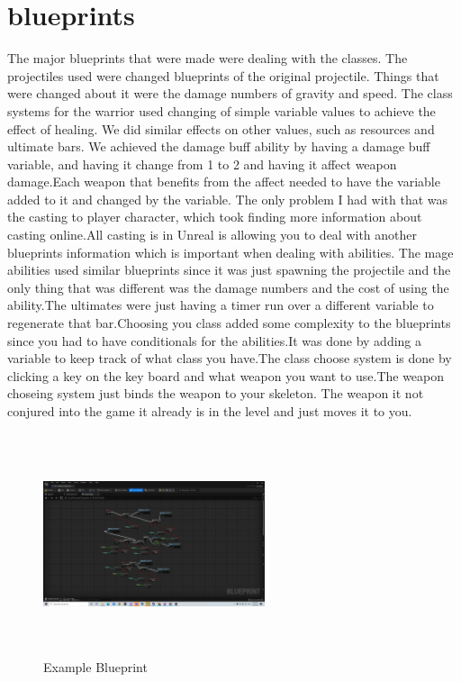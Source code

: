 \documentclass{sigchi}
\begin{document}
\section{blueprints}
The major blueprints that were made were dealing with the classes. The projectiles used were changed blueprints of the original projectile. Things that were changed about it were the damage numbers of gravity and speed. The class systems for the warrior used changing of simple variable values to achieve the effect of healing. We did similar effects on other values, such as resources and ultimate bars. We achieved the damage buff ability by having a damage buff variable, and having it change from 1 to 2 and having it affect weapon damage.Each weapon that benefits from the affect needed to have the variable added to it and changed by the variable. The only problem I had with that was the casting to player character, which took finding more information about casting online.All casting is in Unreal is allowing you  to deal with another blueprints information which is important when dealing with abilities. The mage abilities used similar blueprints since it was just spawning the projectile and the only thing that was different was the damage numbers and the cost of using the ability.The ultimates were just having a timer run over a different variable to regenerate that bar.Choosing you class added some complexity to the blueprints since you had to have conditionals for the abilities.It was done by adding a variable to keep track of what class you have.The class choose system is done by clicking a key on the key board and what weapon you want to use.The weapon choseing system just binds the weapon to your skeleton. The weapon it not conjured into the game it already is in the level and just moves it to you.
\begin{figure}
\includegraphics[width=6.5cm, height=6.5cm]{Figure/blueprint.png}
\caption{Example Blueprint}
\end{figure}
\end{document}
